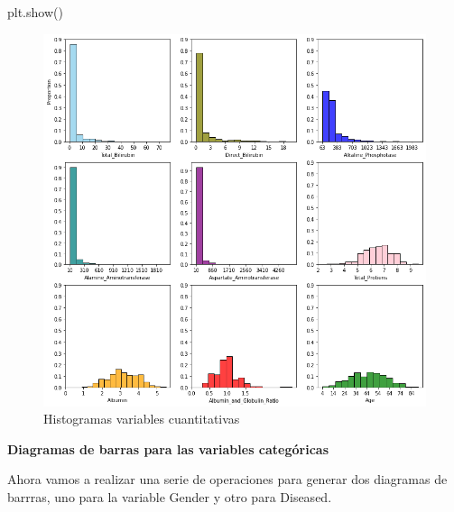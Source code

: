 \documentclass[
  11pt,
  a4paper,
]{article}
\newenvironment{Shaded}{\begin{snugshade}}{\end{snugshade}}
\newcommand{\NormalTok}[1]{#1}
\begin{document}
\begin{Shaded}
\begin{Highlighting}[]
\NormalTok{plt.show()}
\end{Highlighting}
\end{Shaded}

\clearpage

\begin{figure}
\centering
\includegraphics{output_125_0.png}
\caption{Histogramas variables cuantitativas}
\end{figure}

\clearpage

\textbf{Diagramas de barras para las variables categóricas}

Ahora vamos a realizar una serie de operaciones para generar dos
diagramas de barrras, uno para la variable Gender y otro para Diseased.
\end{document}
